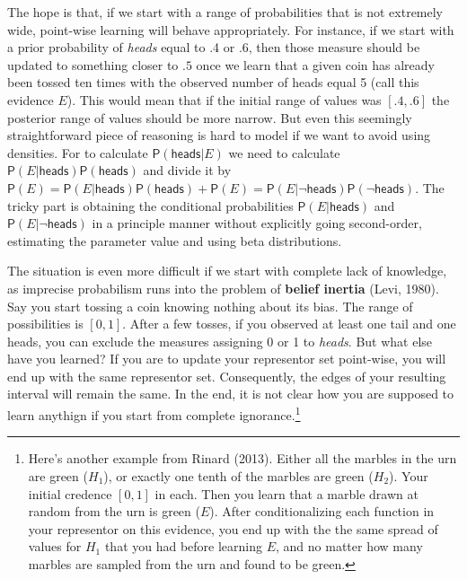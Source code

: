 \documentclass[
  10pt,
  dvipsnames,enabledeprecatedfontcommands]{scrartcl}
\newcommand{\pr}[1]{\mathsf{P}(#1)}
\newcommand{\s}[1]{\mbox{$\mathsf{#1}$}}
\begin{document}
\noindent The hope is that, if we start with a range of probabilities
that is not extremely wide, point-wise learning will behave
appropriately. For instance, if we start with a prior probability of
\emph{heads} equal to .4 or .6, then those measure should be updated to
something closer to \(.5\) once we learn that a given coin has already
been tossed ten times with the observed number of heads equal 5 (call
this evidence \(E\)). This would mean that if the initial range of
values was \([.4,.6]\) the posterior range of values should be more
narrow. But even this seemingly straightforward piece of reasoning is
hard to model if we want to avoid using densities. For to calculate
\(\pr{\s{heads}\vert E}\) we need to calculate
\(\pr{E \vert \s{heads}}\pr{\s{heads}}\) and divide it by
\(\pr{E} = \pr{E \vert \s{heads}}\pr{\s{heads}} + \pr{E} = \pr{E \vert \neg \s{heads}}\pr{\neg \s{heads}}\).
The tricky part is obtaining the conditional probabilities
\(\pr{E \vert \s{heads}}\) and \(\pr{E \vert \neg \s{heads}}\) in a
principle manner without explicitly going second-order, estimating the
parameter value and using beta distributions.

The situation is even more difficult if we start with complete lack of
knowledge, as imprecise probabilism runs into the problem of
\textbf{belief inertia} (Levi, 1980). Say you start tossing a coin
knowing nothing about its bias. The range of possibilities is \([0,1]\).
After a few tosses, if you observed at least one tail and one heads, you
can exclude the measures assigning 0 or 1 to \emph{heads}. But what else
have you learned? If you are to update your representor set point-wise,
you will end up with the same representor set. Consequently, the edges
of your resulting interval will remain the same. In the end, it is not
clear how you are supposed to learn anythign if you start from complete
ignorance.\footnote{Here's another example from Rinard (2013). Either
  all the marbles in the urn are green (\(H_1\)), or exactly one tenth
  of the marbles are green (\(H_2\)). Your initial credence \([0,1]\) in
  each. Then you learn that a marble drawn at random from the urn is
  green (\(E\)). After conditionalizing each function in your
  representor on this evidence, you end up with the the same spread of
  values for \(H_1\) that you had before learning \(E\), and no matter
  how many marbles are sampled from the urn and found to be green.}
\end{document}
